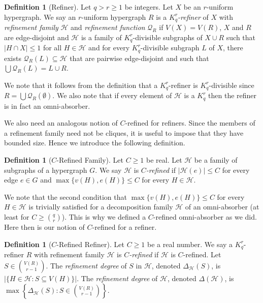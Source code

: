 \documentclass[11pt]{article}
\newcounter{i}
\theoremstyle{plain}
\theoremstyle{plain} %
\theoremstyle{definition}
\newtheorem{definition}[thm]{Definition}
\begin{document}
\begin{definition}[Refiner]
Let $q > r\ge 1$ be integers. Let $X$ be an $r$-uniform hypergraph. We say an $r$-uniform hypergraph $R$ is a \emph{$K_q^r$-refiner} of $X$ with \emph{refinement family} $\mathcal{H}$ and \emph{refinement function} $\mathcal{Q}_R$ if $V(X)=V(R)$, $X$ and $R$ are edge-disjoint and $\mathcal{H}$ is a family of $K_q^r$-divisible subgraphs of $X\cup R$ such that $|H\cap X|\le 1$ for all $H\in\mathcal{H}$ and for every $K_q^r$-divisible subgraph $L$ of $X$, there exists $\mathcal{Q}_R(L)\subseteq \mathcal{H}$ that are pairwise edge-disjoint and such that $\bigcup \mathcal{Q}_R(L)=L\cup R$. 
\end{definition}

We note that it follows from the definition that a $K_q^r$-refiner is $K_q^r$-divisible since $R = \bigcup \mathcal{Q}_R(\emptyset)$. We also note that if every element of $\mathcal{H}$ is a $K_q^r$ then the refiner is in fact an omni-absorber. 

We also need an analogous notion of $C$-refined for refiners. Since the members of a refinement family need not be cliques, it is useful to impose that they have bounded size. Hence we introduce the following definition.

\begin{definition}[$C$-Refined Family]
Let $C\ge 1$ be real. Let $\mathcal{H}$ be a family of subgraphs of a hypergraph $G$.  We say $\mathcal{H}$ is \emph{$C$-refined} if $|\mathcal{H}(e)|\le C$ for every edge $e\in G$ and $\max\{v(H),e(H)\}\le C$ for every $H\in \mathcal{H}$.
\end{definition}

We note that the second condition that $\max\{v(H),e(H)\}\le C$ for every $H\in \mathcal{H}$ is trivially satisfied for a decomposition family $\mathcal{H}$ of an omni-absorber (at least for $C\ge \binom{q}{r}$). This is why we defined a $C$-refined omni-absorber as we did. Here then is our notion of $C$-refined for a refiner.

\begin{definition}[$C$-Refined Refiner]
Let $C\ge 1$ be a real number. We say a $K_q^r$-refiner $R$ with refinement family $\mathcal{H}$ is \emph{$C$-refined} if $\mathcal{H}$ is $C$-refined. Let $S\in \binom{V(R)}{r-1}$. The \emph{refinement degree} of $S$ in $\mathcal{H}$, denoted $\Delta_{\mathcal{H}}(S)$, is $|\{H\in \mathcal{H}: S\subseteq V(H)\}|$. The \emph{refinement degree} of $\mathcal{H}$, denoted $\Delta(\mathcal{H})$, is $\max \left\{ \Delta_{\mathcal{H}}(S): S\in \binom{V(R)}{r-1} \right\}$.
\end{definition}
\end{document}
